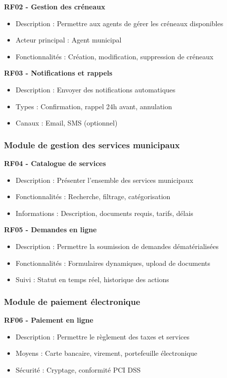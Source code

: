 \textbf{RF02 - Gestion des créneaux}
\begin{itemize}
\item Description : Permettre aux agents de gérer les créneaux disponibles
\item Acteur principal : Agent municipal
\item Fonctionnalités : Création, modification, suppression de créneaux
\end{itemize}

\textbf{RF03 - Notifications et rappels}
\begin{itemize}
\item Description : Envoyer des notifications automatiques
\item Types : Confirmation, rappel 24h avant, annulation
\item Canaux : Email, SMS (optionnel)
\end{itemize}

\subsubsection{Module de gestion des services municipaux}

\textbf{RF04 - Catalogue de services}
\begin{itemize}
\item Description : Présenter l'ensemble des services municipaux
\item Fonctionnalités : Recherche, filtrage, catégorisation
\item Informations : Description, documents requis, tarifs, délais
\end{itemize}

\textbf{RF05 - Demandes en ligne}
\begin{itemize}
\item Description : Permettre la soumission de demandes dématérialisées
\item Fonctionnalités : Formulaires dynamiques, upload de documents
\item Suivi : Statut en temps réel, historique des actions
\end{itemize}

\subsubsection{Module de paiement électronique}

\textbf{RF06 - Paiement en ligne}
\begin{itemize}
\item Description : Permettre le règlement des taxes et services
\item Moyens : Carte bancaire, virement, portefeuille électronique
\item Sécurité : Cryptage, conformité PCI DSS
\end{itemize}

